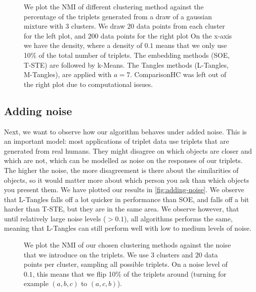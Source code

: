 \onecolumn
\begin{figure}[ht]
    \centering
    \caption{
        We plot the NMI of different clustering method against the percentage of the triplets generated from a draw of a gaussian mixture with $3$ clusters. 
        We draw $20$ data points from each cluster for the left plot, and $200$ data points for the right plot 
        On the x-axis we have the density, where a density of $0.1$ means that we only use 10\% of the total number of triplets. The embedding methods (SOE, T-STE) are 
        followed by k-Means. The Tangles methods (L-Tangles, M-Tangles), are applied with $a=7$. ComparisonHC was left out of the right plot due to computational issues.}
    \label{fig:density-change}
\end{figure}


\subsection{Adding noise}\label{sec:adding-noise}
Next, we want to observe how our algorithm behaves under added noise. This is an important model: most applications of triplet data use triplets that are generated from
real humans. They might disagree on which objects are closer and which are not, which can be modelled as noise on the responses of our triplets. The higher the noise, 
the more disagreement is there about the similarities of objects, so it would matter more about which person you ask than which objects you present them. 
We have plotted our results in \autoref{fig:adding-noise}. 
We observe that L-Tangles falls off a lot quicker in performance than SOE, and falls off a bit harder than T-STE, but they are in the same area. We observe however, that until
relatively large noise levels ($>0.1$), all algorithms performs the same, meaning that L-Tangles can still perform well with low to medium levels of noise.

\begin{figure}[h]
    \centering
    \resizebox{0.7\textwidth}{!}{}
    \label{fig:adding-noise}
    \caption{
        We plot the NMI of our chosen clustering methods against the noise that we introduce on the triplets.  We use $3$ clusters and $20$ data points per cluster, sampling all possible triplets. On a noise level of $0.1$, this means that we flip 10\% of the triplets around (turning for example $(a,b,c)$ to $(a,c,b)$). 
    }
\end{figure}


